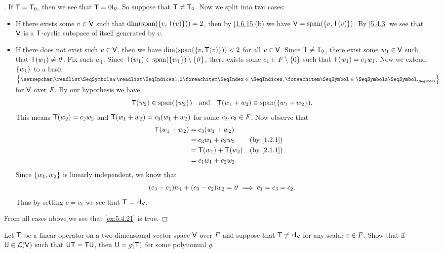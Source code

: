 \begin{proof}[]
  If \(\mathsf{T} = \mathsf{T}_0\), then we see that \(\T = 0 \IT[\V]\).
  So suppose that \(\mathsf{T} \neq \mathsf{T}_0\).
  Now we split into two cases:
  \begin{itemize}
    \item If there exists some \(v \in \mathsf{V}\) such that \(\dim(\spn{\set{v, \T(v)}}) = 2\), then by \cref{1.6.15}(b) we have \(\V = \spn{\set{v, \T(v)}}\).
          By \cref{5.4.3} we see that \(\mathsf{V}\) is a \(\mathsf{T}\)-cyclic subspace of itself generated by \(v\).
    \item If there does not exist such \(v \in \mathsf{V}\), then we have \(\dim(\spn{\set{v, \T(v)}}) < 2\) for all \(v \in \mathsf{V}\).
          Since \(\mathsf{T} \neq \mathsf{T}_0\), there exist some \(w_1 \in \mathsf{V}\) such that \(\mathsf{T}(w_1) \neq \mathit{0}\).
          Fix such \(w_1\).
          Since \(\T(w_1) \in \spn{\set{w_1}} \setminus \set{\zv}\), there exists some \(c_1 \in \mathit{F} \setminus \left\lbrace0\right\rbrace\) such that \(\mathsf{T}(w_1) = c_1 w_1\).
          Now we extend \(\left\lbrace w_1\right\rbrace\) to a basis \(\set{\seq{w}{1,2}}\) for \(\mathsf{V}\) over \(\mathit{F}\).
          By our hypothesis we have
          \[
            \T(w_2) \in \spn{\set{w_2}} \quad \text{and} \quad \T(w_1 + w_2) \in \spn{\set{w_1 + w_2}}.
          \]
          This means \(\mathsf{T}(w_2) = c_2 w_2\) and \(\mathsf{T}(w_1 + w_2) = c_3 (w_1 + w_2)\) for some \(c_2, c_3 \in \mathit{F}\).
          Now observe that
          \begin{align*}
            \T(w_1 + w_2) & = c_3 (w_1 + w_2)                                  \\
                          & = c_3 w_1 + c_3 w_2  &  & \text{(by \cref{1.2.1})} \\
                          & = \T(w_1) + \T(w_2)  &  & \text{(by \cref{2.1.1})} \\
                          & = c_1 w_1 + c_2 w_2.
          \end{align*}
          Since \(\left\lbrace w_1, w_2\right\rbrace\) is linearly independent, we know that
          \[
            (c_3 - c_1) w_1 + (c_3 - c_2) w_2 = \mathit{0} \implies c_1 = c_3 = c_2.
          \]
          Thus by setting \(c = c_1\) we see that \(\T = c \IT[\V]\).
  \end{itemize}
  From all cases above we see that \cref{ex:5.4.21} is true.
\end{proof}

\begin{ex}\label{ex:5.4.22}
  Let \(\mathsf{T}\) be a linear operator on a two-dimensional vector space \(\mathsf{V}\) over \(\mathit{F}\) and suppose that \(\T \neq c \IT[\V]\) for any scalar \(c \in \mathit{F}\).
  Show that if \(\mathsf{U} \in \mathcal{L}(\mathsf{V})\) such that \(\mathsf{U} \mathsf{T} = \mathsf{T} \mathsf{U}\), then \(\mathsf{U} = g(\mathsf{T})\) for some polynomial \(g\).
\end{ex}

